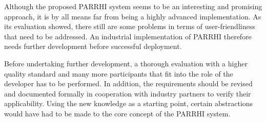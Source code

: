 Although the proposed PARRHI system seems to be an interesting and promising approach, it is by all means far from being a highly advanced implementation. As its evaluation showed, there still are some problems in terms of user-friendliness that need to be addressed. An industrial implementation of PARRHI therefore needs further development before successful deployment.

Before undertaking further development, a thorough evaluation with a higher quality standard and many more participants that fit into the role of the developer has to be performed. In addition, the requirements should be revised and documented formally in cooperation with industry partners to verify their applicability. Using the new knowledge as a starting point, certain abstractions would have had to be made to the core concept of the PARRHI system.












